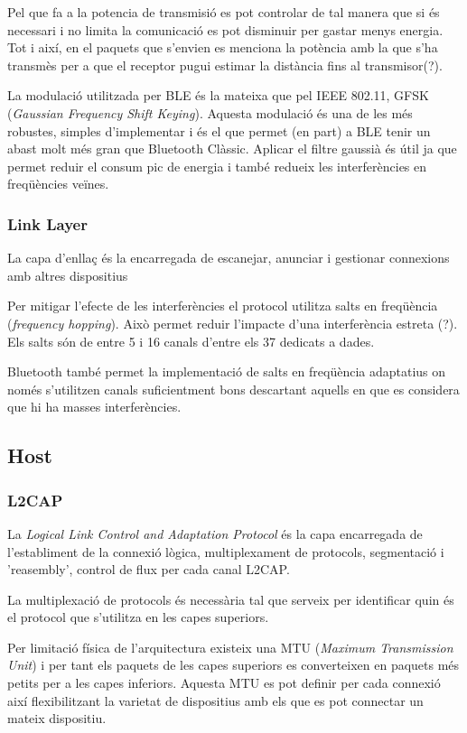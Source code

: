 Pel que fa a la potencia de transmisió es pot controlar de tal manera que si és necessari i no limita la comunicació es pot disminuir per gastar menys energia. Tot i així, en el paquets que s'envien es menciona la potència amb la que s'ha transmès per a que el receptor pugui estimar la distància fins al transmisor(?).

La modulació utilitzada per BLE és la mateixa que pel IEEE 802.11, GFSK (\textit{Gaussian Frequency Shift Keying}). Aquesta modulació és una de les més robustes, simples d'implementar i és el que permet (en part) a BLE tenir un abast molt més gran que Bluetooth Clàssic. Aplicar el filtre gaussià és útil ja que permet reduir el consum pic de energia \cite{BLE_Review} i també redueix les interferències en freqüències veïnes.


\subsubsection{Link Layer}

La capa d'enllaç és la encarregada de escanejar, anunciar i gestionar connexions amb altres dispositius

Per mitigar l'efecte de les interferències el protocol utilitza salts en freqüència (\textit{frequency hopping}). Això permet reduir l'impacte d'una interferència estreta (?). Els salts són de entre 5 i 16 canals d'entre els 37 dedicats a dades.

Bluetooth també permet la implementació de salts en freqüència adaptatius on només s'utilitzen canals suficientment bons descartant aquells en que es considera que hi ha masses interferències.

\subsection{Host}
\subsubsection{L2CAP}
La \textit{Logical Link Control and Adaptation Protocol} és la capa encarregada de l'establiment de la connexió lògica, multiplexament de protocols, segmentació i 'reasembly', control de flux per cada canal L2CAP.

La multiplexació de protocols és necessària tal que serveix per identificar quin és el protocol que s'utilitza en les capes superiors.

Per limitació física de l'arquitectura existeix una MTU (\textit{Maximum Transmission Unit}) i per tant els paquets de les capes superiors es converteixen en paquets més petits per a les capes inferiors.
Aquesta MTU es pot definir per cada connexió així flexibilitzant la varietat de dispositius amb els que es pot connectar un mateix dispositiu.

